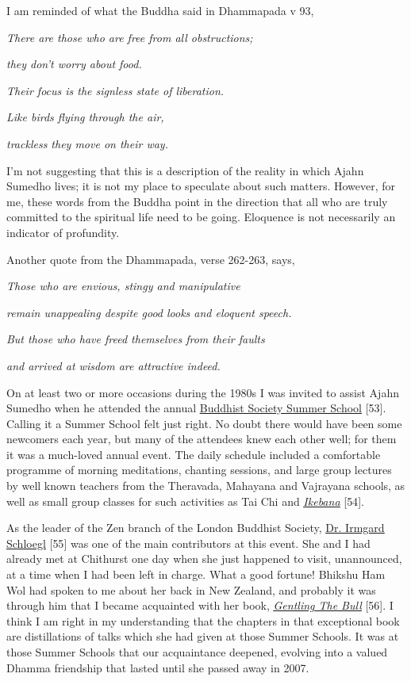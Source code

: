 I am reminded of what the Buddha said in Dhammapada v 93,

\emph{There are those who are free from all obstructions;}

\emph{they don't worry about food.}

\emph{Their focus is the signless state of liberation.}

\emph{Like birds flying through the air,}

\emph{trackless they move on their way.}

I'm not suggesting that this is a description of the reality in which
Ajahn Sumedho lives; it is not my place to speculate about such matters.
However, for me, these words from the Buddha point in the direction that
all who are truly committed to the spiritual life need to be going.
Eloquence is not necessarily an indicator of profundity.

Another quote from the Dhammapada, verse 262-263, says,

\emph{Those who are envious, stingy and manipulative}

\emph{remain unappealing despite good looks and eloquent speech.}

\emph{But those who have freed themselves from their faults}

\emph{and arrived at wisdom are attractive indeed.}

On at least two or more occasions during the 1980s I was invited to
assist Ajahn Sumedho when he attended the annual
\href{https://www.thebuddhistsociety.org/}{\underline{Buddhist Society
Summer School}} {[}53{]}. Calling it a Summer School felt just right. No
doubt there would have been some newcomers each year, but many of the
attendees knew each other well; for them it was a much-loved annual
event. The daily schedule included a comfortable programme of morning
meditations, chanting sessions, and large group lectures by well known
teachers from the Theravada, Mahayana and Vajrayana schools, as well as
small group classes for such activities as Tai Chi and
\emph{\underline{\href{https://en.wikipedia.org/wiki/Ikebana}{Ikebana}}}
{[}54{]}.

As the leader of the Zen branch of the London Buddhist Society,
\href{https://en.wikipedia.org/wiki/Myokyo-ni}{\underline{Dr. Irmgard
Schloegl}} {[}55{]} was one of the main contributors at this event. She
and I had already met at Chithurst one day when she just happened to
visit, unannounced, at a time when I had been left in charge. What a
good fortune! Bhikshu Ham Wol had spoken to me about her back in New
Zealand, and probably it was through him that I became acquainted with
her book,
\href{https://www.thebuddhistsociety.org/page/shop}{\emph{\underline{Gentling
The Bull}}} {[}56{]}. I think I am right in my understanding that the
chapters in that exceptional book are distillations of talks which she
had given at those Summer Schools. It was at those Summer Schools that
our acquaintance deepened, evolving into a valued Dhamma friendship that
lasted until she passed away in 2007.


